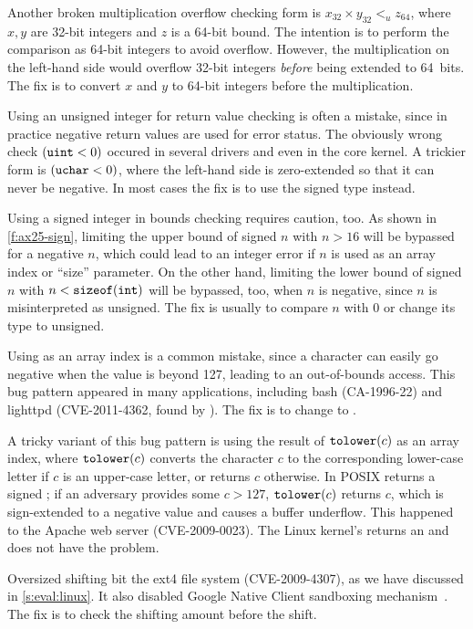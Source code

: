 Another broken multiplication overflow checking form is $x_{32}
\times y_{32} <_u z_{64}$, where $x, y$ are 32-bit integers and $z$
is a 64-bit bound.  The intention is to perform the comparison as
64-bit integers to avoid overflow.  However, the multiplication on
the left-hand side would overflow 32-bit integers \emph{before}
being extended to 64~bits.  The fix is to convert $x$ and $y$ to
64-bit integers before the multiplication.

Using an unsigned integer for return value checking is often a mistake,
since in practice negative return values are used for error status.
The obviously wrong check $(\texttt{uint} < 0)$ occured in several
drivers and even in the core kernel.  A trickier form is $(\texttt{uchar}
< 0)$, where the left-hand side is zero-extended so that it can
never be negative.  In most cases the fix is to use the signed type
instead.

Using a signed integer in bounds checking requires caution, too.  As
shown in \autoref{f:ax25-sign}, limiting the upper bound of signed
$n$ with $n > 16$ will be bypassed for a negative $n$, which could
lead to an integer error if $n$ is used as an array index or ``size''
parameter.  On the other hand, limiting the lower bound of signed
$n$ with $n < \texttt{sizeof}(\texttt{int})$ will be bypassed, too, when
$n$ is negative, since $n$ is misinterpreted as unsigned.  The fix
is usually to compare $n$ with 0 or change its type to unsigned.

Using  as an array index is a common mistake, since a
character can easily go negative when the value is beyond 127,
leading to an out-of-bounds access.  This bug pattern appeared
in many applications, including bash (CA-1996-22) and
lighttpd (CVE-2011-4362, found by \sys).  The fix is to
change  to .

A tricky variant of this bug pattern is using the result of
$\texttt{tolower}(c)$ as an array index, where $\texttt{tolower}(c)$ converts
the character $c$ to the corresponding lower-case letter if $c$ is
an upper-case letter, or returns $c$ otherwise.  In POSIX 
returns a signed ; if an adversary provides some $c > 127$,
$\texttt{tolower}(c)$ returns $c$, which is sign-extended to a negative
value and causes a buffer underflow.  This happened to the
Apache web server (CVE-2009-0023).  The Linux kernel's 
returns an  and does not have the problem.

Oversized shifting bit the ext4 file system (CVE-2009-4307),
as we have discussed in \autoref{s:eval:linux}.
It also disabled Google Native Client sandboxing mechanism~\cite{nacl}.
The fix is to check the shifting amount before the shift.


